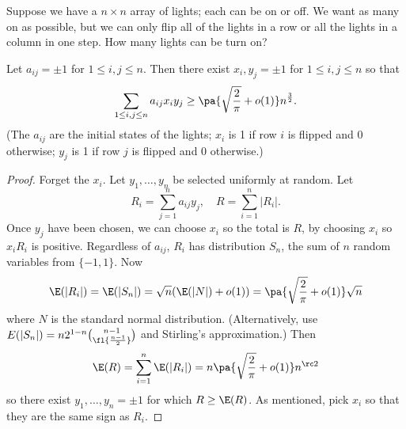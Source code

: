 Suppose we have a $n\times n$ array of lights; each can be on or off. We want as many on as possible, but we can only flip all of the lights in a row or all the lights in a column in one step. How many lights can be turn on?
\begin{thm}
Let $a_{ij}=\pm 1$ for $1\leq i,j\leq n$. Then there exist $x_i,y_j=\pm 1$ for $1\leq i,j\leq n$ so that 
\[
\sum_{1\leq i,j\leq n}a_{ij}x_iy_j\geq \pa{\sqrt{\frac{ 2}{\pi}}+o(1)}n^{\frac 32}.
\]
(The $a_{ij}$ are the initial states of the lights; $x_i$ is 1 if row $i$ is flipped and 0 otherwise; $y_j$ is 1 if row $j$ is flipped and 0 otherwise.)
\end{thm}
\begin{proof}
Forget the $x_i$. Let $y_1,\ldots, y_n$ be selected uniformly at random. Let \[R_i=\sum_{j=1}^n a_{ij}y_j,\quad R=\sum_{i=1}^n |R_i|.\]
Once $y_j$ have been chosen, we can choose $x_i$ so the total is $R$, by choosing $x_i$ so $x_iR_i$ is positive.
Regardless of $a_{ij}$, $R_i$ has distribution $S_n$, the sum of $n$ random variables from $\{-1,1\}$. Now
\[
\E(|R_i|)=\E(|S_n|)=\sqrt{n}(\E(|N|)+o(1))=\pa{\sqrt{\frac 2{\pi}}+o(1)}\sqrt n
\]
where $N$ is the standard normal distribution. (Alternatively, use $E(|S_n|)=n2^{1-n} \binom{n-1}{\fl{\frac{n-1}{2}}}$ and Stirling's approximation.) Then
\[\E(R)=\sum_{i=1}^n \E(|R_i|)=n\pa{\sqrt{\frac{2}{\pi}}+o(1)}n^{\rc 2}\]
so there exist $y_1,\ldots, y_n=\pm1$ for which $R\geq \E(R)$. As mentioned, pick $x_i$ so that they are the same sign as $R_i$.
\end{proof}
